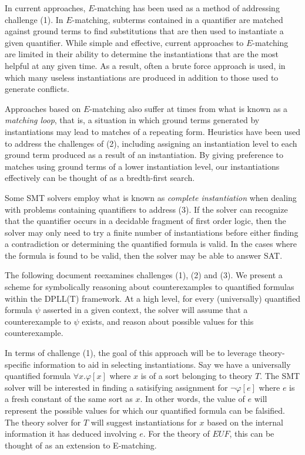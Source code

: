 \documentclass{llncs}
\begin{document}
In current approaches, $E$-matching has been used as a method of addressing challenge (1).
In $E$-matching, subterms contained in a quantifier are matched against ground terms to find substitutions that are then used to instantiate a given quantifier.
While simple and effective, current approaches to $E$-matching are limited in their ability to determine the instantiations that are the most helpful at any given time.
As a result, often a brute force approach is used, in which many useless instantiations are produced in addition to those used to generate conflicts.

Approaches based on $E$-matching also suffer at times from what is known as a \emph{matching loop}, that is, a situation in which ground terms generated by instantiations may lead to matches of a repeating form.
Heuristics have been used to address the challenges of (2), including assigning an instantiation level to each ground term produced as a result of an instantiation.
By giving preference to matches using ground terms of a lower instantiation level, our instantiations effectively can be thought of as a bredth-first search.

Some SMT solvers employ what is known as \emph{complete instantiation} when dealing with problems containing quantifiers to address (3).
If the solver can recognize that the quantifier occurs in a decidable fragment of first order logic, then the solver may only need to try a finite number of instantiations before either finding a contradiction or determining the quantified formula is valid.
In the cases where the formula is found to be valid, then the solver may be able to answer SAT.

The following document reexamines challenges (1), (2) and (3).
We present a scheme for symbolically reasoning about counterexamples to quantified formulas within the DPLL(T) framework.
At a high level, for every (universally) quantified formula $\psi$ asserted in a given context, the solver will assume that a counterexample to $\psi$ exists, and reason about possible values for this counterexample.

In terms of challenge (1), the goal of this approach will be to leverage theory-specific information to aid in selecting instantiations.
Say we have a universally quantified formula $\forall x. \varphi[x]$ where $x$ is of a sort belonging to theory $T$.
The SMT solver will be interested in finding a satisifying assignment for $ \neg \varphi[e]$ where $e$ is a fresh constant of the same sort as $x$.
In other words, the value of $e$ will represent the possible values for which our quantified formula can be falsified.
The theory solver for $T$ will suggest instantiations for $x$ based on the internal information it has deduced involving $e$.
For the theory of $EUF$, this can be thought of as an extension to E-matching.
\end{document}

